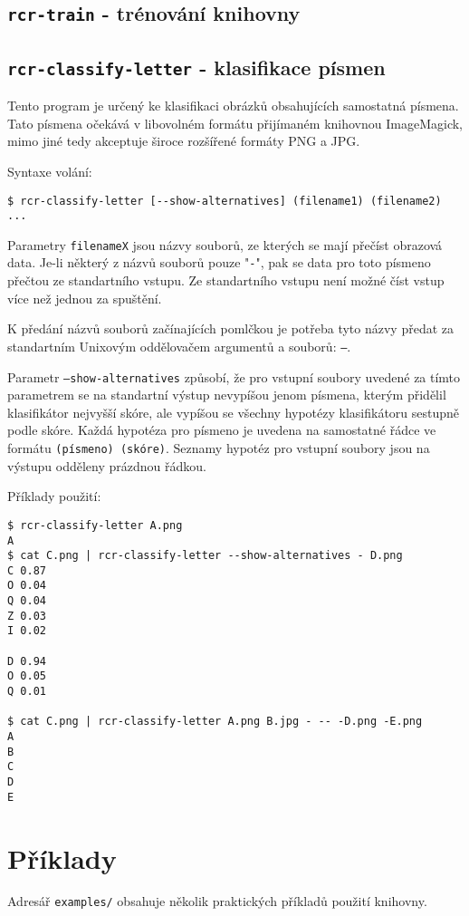 \documentclass[a4paper]{article}
\begin{document}
\subsection{\texttt{rcr-train} - trénování knihovny}

\subsection{\texttt{rcr-classify-letter} - klasifikace písmen}
Tento program je určený ke klasifikaci obrázků obsahujících samostatná písmena.
Tato písmena očekává v libovolném formátu přijímaném knihovnou ImageMagick,
mimo jiné tedy akceptuje široce rozšířené formáty PNG a JPG.

Syntaxe volání:
\begin{lstlisting}
$ rcr-classify-letter [--show-alternatives] (filename1) (filename2) ...
\end{lstlisting}

Parametry \texttt{filenameX} jsou názvy souborů, ze kterých se mají přečíst
obrazová data. Je-li některý z názvů souborů pouze "\texttt{-}", pak se data
pro toto písmeno přečtou ze standartního vstupu. Ze standartního vstupu
není možné číst vstup více než jednou za spuštění.

K předání názvů souborů začínajících pomlčkou je potřeba tyto názvy předat
za standartním Unixovým oddělovačem argumentů a souborů: \texttt{--}.

Parametr \texttt{--show-alternatives} způsobí, že pro vstupní soubory
uvedené za tímto parametrem se na standartní výstup nevypíšou jenom
písmena, kterým přidělil klasifikátor nejvyšší skóre, ale vypíšou se
všechny hypotézy klasifikátoru sestupně podle skóre. Každá hypotéza
pro písmeno je uvedena na samostatné řádce ve formátu \texttt{(písmeno)
(skóre)}. Seznamy hypotéz pro vstupní soubory jsou na výstupu odděleny prázdnou
řádkou.

Příklady použití:
\begin{lstlisting}
$ rcr-classify-letter A.png
A
$ cat C.png | rcr-classify-letter --show-alternatives - D.png
C 0.87
O 0.04
Q 0.04
Z 0.03
I 0.02

D 0.94
O 0.05
Q 0.01

$ cat C.png | rcr-classify-letter A.png B.jpg - -- -D.png -E.png
A
B
C
D
E
\end{lstlisting}

\section{Příklady}
Adresář \texttt{examples/} obsahuje několik praktických příkladů použití knihovny.
\end{document}
